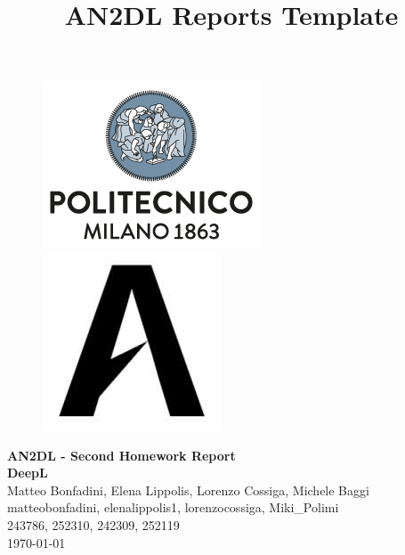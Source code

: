 \documentclass[11pt]{article}
\title{AN2DL Reports Template}
\begin{document}
    
    \begin{figure}[H]
        \raggedright
        \includegraphics[scale=0.4]{figures/polimi.png} \hfill \includegraphics[scale=0.3]{figures/airlab.jpeg}
    \end{figure}
    
    \vspace{5mm}
    
    \begin{center}
        {\Large \textbf{AN2DL - Second Homework Report}}\\
        \vspace{2mm}
        {\Large \textbf{DeepL}}\\
        \vspace{2mm}
        {\large Matteo Bonfadini,}
        {\large Elena Lippolis,}
        {\large Lorenzo Cossiga,}
        {\large Michele Baggi}\\
        \vspace{2mm}
        {matteobonfadini,}
        {elenalippolis1,}
        {lorenzocossiga,}
        {Miki\_Polimi}\\
        \vspace{2mm}
        {243786,}
        {252310,}
        {242309,}
        {252119}\\
        \vspace{5mm}
        \today
    \end{center}    
\end{document}
